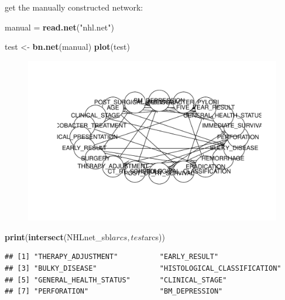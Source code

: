 \documentclass[]{article}
\newenvironment{Shaded}{\begin{snugshade}}{\end{snugshade}}
\newcommand{\KeywordTok}[1]{\textcolor[rgb]{0.13,0.29,0.53}{\textbf{{#1}}}}
\newcommand{\StringTok}[1]{\textcolor[rgb]{0.31,0.60,0.02}{{#1}}}
\newcommand{\NormalTok}[1]{{#1}}
\begin{document}
get the manually constructed network:

\begin{Shaded}
\begin{Highlighting}[]
\NormalTok{manual =}\StringTok{ }\KeywordTok{read.net}\NormalTok{(}\StringTok{"nhl.net"}\NormalTok{)}


\NormalTok{test <-}\StringTok{ }\KeywordTok{bn.net}\NormalTok{(manual)}
\KeywordTok{plot}\NormalTok{(test)}
\end{Highlighting}
\end{Shaded}

\begin{figure}[htbp]
\centering
\includegraphics{BN_Ass2_files/figure-latex/unnamed-chunk-8-1.pdf}
\end{figure}

\begin{Shaded}
\begin{Highlighting}[]
\KeywordTok{print}\NormalTok{(}\KeywordTok{intersect}\NormalTok{(NHLnet_sbl$arcs,test$arcs))}
\end{Highlighting}
\end{Shaded}

\begin{verbatim}
## [1] "THERAPY_ADJUSTMENT"          "EARLY_RESULT"               
## [3] "BULKY_DISEASE"               "HISTOLOGICAL_CLASSIFICATION"
## [5] "GENERAL_HEALTH_STATUS"       "CLINICAL_STAGE"             
## [7] "PERFORATION"                 "BM_DEPRESSION"
\end{verbatim}

\begin{Shaded}
\end{Shaded}
\end{document}
